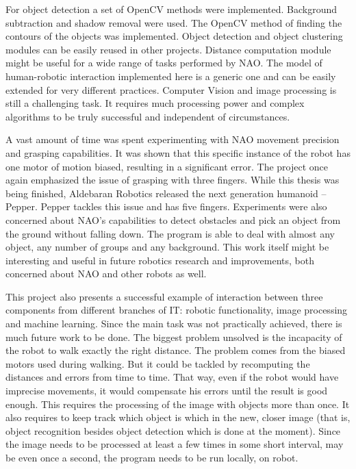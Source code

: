 	For object detection a set of OpenCV methods were implemented. Background subtraction and shadow removal were used. The OpenCV method of finding the contours of the objects was implemented. Object detection and object clustering modules can be easily reused in other projects. Distance computation module might be useful for a wide range of tasks performed by NAO. The model of human-robotic interaction implemented here is a generic one and can be easily extended for very different practices. Computer Vision and image processing is still a challenging task. It requires much processing power and complex algorithms to be truly successful and independent of circumstances.

	A vast amount of time was spent experimenting with NAO movement precision and grasping capabilities. It was shown that this specific instance of the robot has one motor of motion biased, resulting in a significant error. The project once again emphasized the issue of grasping with three fingers. While this thesis was being finished, Aldebaran Robotics released the next generation humanoid -- Pepper. Pepper tackles this issue and has five fingers. Experiments were also concerned about NAO's capabilities to detect obstacles and pick an object from the ground without falling down. The program is able to deal with almost any object, any number of groups and any background. This work itself might be interesting and useful in future robotics research and improvements, both concerned about NAO and other robots as well.  

	This project also presents a successful example of interaction between three components from different branches of IT: robotic functionality, image processing and machine learning. Since the main task was not practically achieved, there is much future work to be done. The biggest problem unsolved is the incapacity of the robot to walk exactly the right distance. The problem comes from the biased motors used during walking. But it could be tackled by recomputing the distances and errors from time to time. That way, even if the robot would have imprecise movements, it would compensate his errors until the result is good enough. This requires the processing of the image with objects more than once. It also requires to keep track which object is which in the new, closer image (that is, object recognition besides object detection which is done at the moment). Since the image needs to be processed at least a few times in some short interval, may be even once a second, the program needs to be run locally, on robot. 


